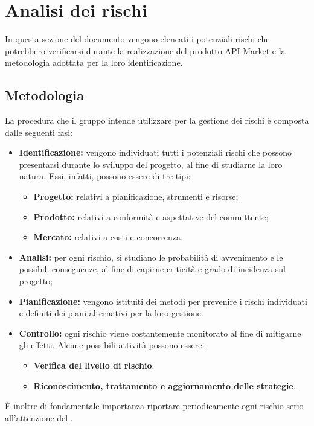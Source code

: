 \newpage
\section{Analisi dei rischi}
In questa sezione del documento vengono elencati i potenziali rischi che potrebbero verificarsi durante la realizzazione del prodotto API Market e la metodologia adottata per la loro identificazione.

\subsection{Metodologia}

La procedura che il gruppo \textit{\gruppo} intende utilizzare per la gestione dei rischi è composta dalle seguenti fasi:
\begin{itemize}
	\item \textbf{Identificazione:} vengono individuati tutti i potenziali rischi che possono presentarsi durante lo sviluppo del progetto, al fine di studiarne la loro natura. Essi, infatti, possono essere di tre tipi:
	\begin{itemize}
		\item \textbf{Progetto:} relativi a pianificazione, strumenti e risorse;
		\item \textbf{Prodotto:} relativi a conformità e aspettative del committente;
		\item \textbf{Mercato:} relativi a costi e concorrenza.
	\end{itemize}
	\item \textbf{Analisi:} per ogni rischio, si studiano le probabilità di avvenimento e le possibili conseguenze, al fine di capirne criticità e grado di incidenza sul progetto;
	\item \textbf{Pianificazione:} vengono istituiti dei metodi per prevenire i rischi individuati e definiti dei piani alternativi per la loro gestione.
	\item \textbf{Controllo:} ogni rischio viene costantemente monitorato al fine di mitigarne gli effetti. Alcune possibili attività possono essere:
		\begin{itemize}
		\item \textbf{Verifica del livello di rischio};
		\item \textbf{Riconoscimento, trattamento e aggiornamento delle strategie}.
		\end{itemize}
	\end{itemize}
\MakeUppercase{è} inoltre di fondamentale importanza riportare periodicamente ogni rischio serio all'attenzione del \textit{\RdP}.

